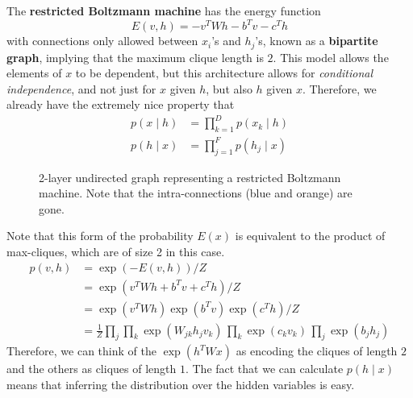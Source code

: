 \documentclass{article}
\begin{document}
  \begin{definition}
    \label{def:restricted-boltzmann-machine}
 
    The \textbf{restricted Boltzmann machine} has the energy function 
    \begin{equation}
      E(v, h) = - v^T W h - b^T v - c^T h
    \end{equation}
    with connections only allowed between $x_i$'s and $h_j$'s, known as a \textbf{bipartite graph}, implying that the maximum clique length is $2$. This model allows the elements of $x$ to be dependent, but this architecture allows for \textit{conditional independence}, and not just for $x$ given $h$, but also $h$ given $x$. Therefore, we already have the extremely nice property that 
    \begin{align} 
      p(x \mid h) & = \prod_{k=1}^{D} p(x_k \mid h) \\
      p(h \mid x) & = \prod_{j=1}^F p(h_j \mid x) 
    \end{align}

    \begin{figure}[H]
      \centering 
      \caption{2-layer undirected graph representing a restricted Boltzmann machine. Note that the intra-connections (blue and orange) are gone. } 
      \label{fig:rbm}
    \end{figure}
  \end{definition}

  Note that this form of the probability $E(x)$ is equivalent to the product of max-cliques, which are of size 2 in this case. 
  \begin{align}
    p(v, h) & = \exp(-E(v, h)) / Z \\ 
            & = \exp(v^T W h + b^T v + c^T h) / Z \\
            & = \exp(v^T W h) \exp(b^T v) \exp (c^T h) / Z  \\
            & = \frac{1}{Z} \prod_j \prod_k \exp(W_{jk} h_j v_k) \, \prod_k \exp(c_k v_k) \, \prod_j \exp(b_j h_j)
  \end{align}
  Therefore, we can think of the $\exp(h^T W x)$ as encoding the cliques of length $2$ and the others as cliques of length $1$. The fact that we can calculate $p(h \mid x)$ means that inferring the distribution over the hidden variables is easy. 
\end{document}
